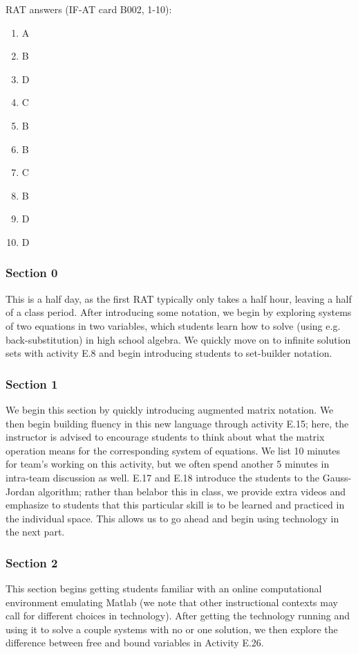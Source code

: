\documentclass{article}
\begin{document}
RAT answers (IF-AT card B002, 1-10):
\begin{multicols}{10}
\begin{enumerate}[1)]
\item A
\item B
\item D
\item C
\item B
\item B
\item C
\item B
\item D
\item D
\end{enumerate}
\end{multicols}

\subsubsection*{Section 0}
This is a half day, as the first RAT typically only takes a half hour, leaving a half of a class period.  After introducing some notation, we begin by exploring systems of two equations in two variables, which students learn how to solve (using e.g. back-substitution) in high school algebra.  We quickly move on to infinite solution sets with activity E.8 and begin introducing students to set-builder notation.


\subsubsection*{Section 1}
We begin this section by quickly introducing augmented matrix notation.  We then begin building fluency in this new language through activity E.15; here, the instructor is advised to encourage students to think about what the matrix operation means for the corresponding system of equations.  We list 10 minutes for team's working on this activity, but we often spend another 5 minutes in intra-team discussion as well.  E.17 and E.18 introduce the students to the Gauss-Jordan algorithm; rather than belabor this in class, we provide extra videos and emphasize to students that this particular skill is to be learned and practiced in the individual space.  This allows us to go ahead and begin using technology in the next part.

\subsubsection*{Section 2}
This section begins getting students familiar with an online computational environment emulating Matlab (we note that other instructional contexts may call for different choices in technology).  After getting the technology running and using it to solve a couple systems with no or one solution, we then explore the difference between free and bound variables in Activity E.26.
\end{document}
